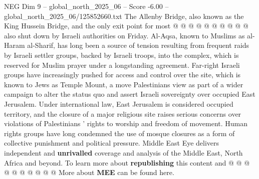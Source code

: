 \begin{textsample}{NEG Dim 9 – global\_north\_2025\_06 – Score -6.00 – global\_north\_2025\_06/125852660.txt}
The Allenby Bridge, also known as the King Hussein Bridge, and the only exit point for most @ @ @ @ @ @ @ @ @ @ also shut down by Israeli authorities on Friday.
Al-Aqsa, known to Muslims as al-Haram al-Sharif, has long been a source of tension resulting from frequent raids by Israeli settler groups, backed by Israeli troops, into the complex, which is reserved for Muslim prayer under a longstanding agreement.
Far-right Israeli groups have increasingly pushed for access and control over the site, which is known to Jews as Temple Mount, a move Palestinians view as part of a wider campaign to alter the status quo and assert Israeli sovereignty over occupied East Jerusalem.
Under international law, East Jerusalem is considered occupied territory, and the closure of a major religious site raises serious concerns over violations of Palestinians ' rights to worship and freedom of movement.
Human rights groups have long condemned the use of mosque closures as a form of collective punishment and political pressure.
Middle East Eye delivers independent and \textbf{unrivalled} coverage and analysis of the Middle East, North Africa and beyond.
To learn more about \textbf{republishing} this content and @ @ @ @ @ @ @ @ @ @ More about \textbf{MEE} can be found here.

\end{textsample}
